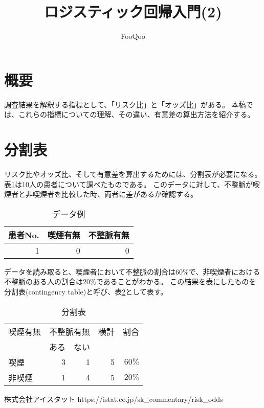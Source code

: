 \documentclass{ltjsarticle}
\title{ロジスティック回帰入門(2)}
\author{FooQoo}
\begin{document}
\maketitle
\section{概要}
調査結果を解釈する指標として、「リスク比」と「オッズ比」がある。
本稿では、これらの指標についての理解、その違い、有意差の算出方法を紹介する。

\section{分割表}
リスク比やオッズ比、そして有意差を算出するためには、分割表が必要になる。
表\ref{tbl:sample}は10人の患者について調べたものである。
このデータに対して、不整脈が喫煙者と非喫煙者を比較した時、両者に差があるか確認する。

\begin{table}[b]
    \caption{データ例}
    \label{tbl:sample}
    \centering
    \begin{tabular}{r|r|r} \hline
        \multicolumn{1}{l}{患者No.} & \multicolumn{1}{|l|}{喫煙有無} & \multicolumn{1}{l}{不整脈有無} \\ \hline \hline
        1 & 0 & 0 \\ \hline
    \end{tabular}
\end{table}

データを読み取ると、喫煙者において不整脈の割合は$60\%$で、非喫煙者における不整脈のある人の割合は$20\%$であることがわかる。
この結果を表にしたものを分割表(contingency table)と呼び、表\ref{tbl:c}として表す。

\begin{table}[b]
    \caption{分割表}
    \label{tbl:c}
    \centering
    \begin{tabular}{l|r|r|r|r} \hline 
        \multicolumn{1}{l}{喫煙有無} & \multicolumn{2}{|l|}{不整脈有無} & \multicolumn{1}{|l|}{横計} & \multicolumn{1}{l}{割合}\\ \cline{2-3}
        & ある & ない & & \\ \hline \hline
        喫煙 & 3 & 1 & 5 & $60\%$ \\
        非喫煙 & 1 & 4 & 5 & $20\%$ \\ \hline 
    \end{tabular}
\end{table}


\begin{thebibliography}{1}
     株式会社アイスタット https://istat.co.jp/sk\_commentary/risk\_odds
\end{thebibliography}
\end{document}
